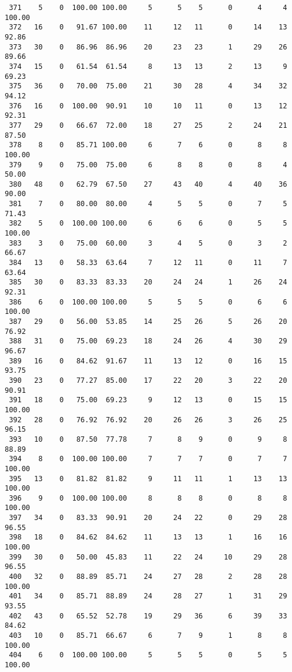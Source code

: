 \begin{verbatim}
 371    5    0  100.00 100.00     5      5    5      0      4     4   100.00
 372   16    0   91.67 100.00    11     12   11      0     14    13    92.86
 373   30    0   86.96  86.96    20     23   23      1     29    26    89.66
 374   15    0   61.54  61.54     8     13   13      2     13     9    69.23
 375   36    0   70.00  75.00    21     30   28      4     34    32    94.12
 376   16    0  100.00  90.91    10     10   11      0     13    12    92.31
 377   29    0   66.67  72.00    18     27   25      2     24    21    87.50
 378    8    0   85.71 100.00     6      7    6      0      8     8   100.00
 379    9    0   75.00  75.00     6      8    8      0      8     4    50.00
 380   48    0   62.79  67.50    27     43   40      4     40    36    90.00
 381    7    0   80.00  80.00     4      5    5      0      7     5    71.43
 382    5    0  100.00 100.00     6      6    6      0      5     5   100.00
 383    3    0   75.00  60.00     3      4    5      0      3     2    66.67
 384   13    0   58.33  63.64     7     12   11      0     11     7    63.64
 385   30    0   83.33  83.33    20     24   24      1     26    24    92.31
 386    6    0  100.00 100.00     5      5    5      0      6     6   100.00
 387   29    0   56.00  53.85    14     25   26      5     26    20    76.92
 388   31    0   75.00  69.23    18     24   26      4     30    29    96.67
 389   16    0   84.62  91.67    11     13   12      0     16    15    93.75
 390   23    0   77.27  85.00    17     22   20      3     22    20    90.91
 391   18    0   75.00  69.23     9     12   13      0     15    15   100.00
 392   28    0   76.92  76.92    20     26   26      3     26    25    96.15
 393   10    0   87.50  77.78     7      8    9      0      9     8    88.89
 394    8    0  100.00 100.00     7      7    7      0      7     7   100.00
 395   13    0   81.82  81.82     9     11   11      1     13    13   100.00
 396    9    0  100.00 100.00     8      8    8      0      8     8   100.00
 397   34    0   83.33  90.91    20     24   22      0     29    28    96.55
 398   18    0   84.62  84.62    11     13   13      1     16    16   100.00
 399   30    0   50.00  45.83    11     22   24     10     29    28    96.55
 400   32    0   88.89  85.71    24     27   28      2     28    28   100.00
 401   34    0   85.71  88.89    24     28   27      1     31    29    93.55
 402   43    0   65.52  52.78    19     29   36      6     39    33    84.62
 403   10    0   85.71  66.67     6      7    9      1      8     8   100.00
 404    6    0  100.00 100.00     5      5    5      0      5     5   100.00

\end{verbatim}
